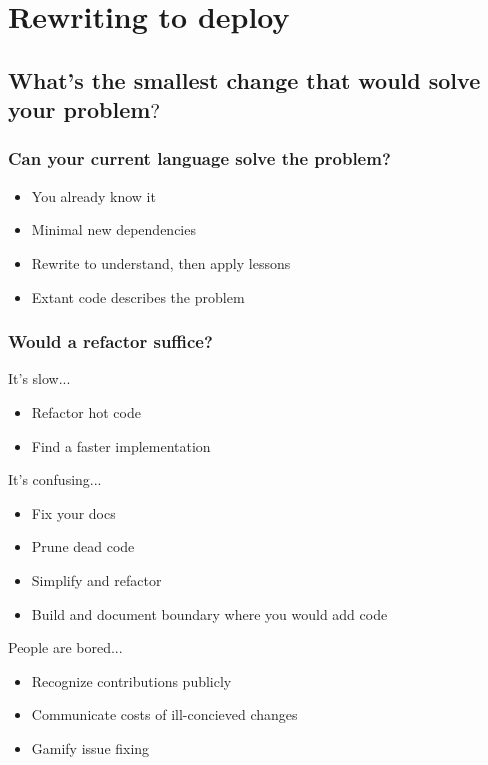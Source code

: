 \documentclass{beamer}
\begin{document}
\section{Rewriting to deploy}

\begin{frame}[fragile]
\tableofcontents [currentsection]
\end{frame}

\subsection{What's the smallest change that would solve your problem$?$}

\begin{frame}[fragile]
\tableofcontents[currentsubsection]
\end{frame}

\begin{frame}[fragile]
\frametitle{Can your current language solve the problem?}
\begin{itemize}[<+(1)->]
\item You already know it
\item Minimal new dependencies
\item Rewrite to understand, then apply lessons
\item Extant code describes the problem
\end{itemize}
\end{frame}

\begin{frame}[fragile]
\frametitle{Would a refactor suffice?}
It's slow...
\begin{itemize}[<+(1)->]
\item Refactor hot code
\item Find a faster implementation
\end{itemize}
It's confusing...
\begin{itemize}[<+(1)->]
\item Fix your docs
\item Prune dead code
\item Simplify and refactor
\item Build and document boundary where you would add code
\end{itemize}
People are bored...
\begin{itemize}[<+(1)->]
\item Recognize contributions publicly
\item Communicate costs of ill-concieved changes
\item Gamify issue fixing
\end{itemize}
\end{frame}
\end{document}
